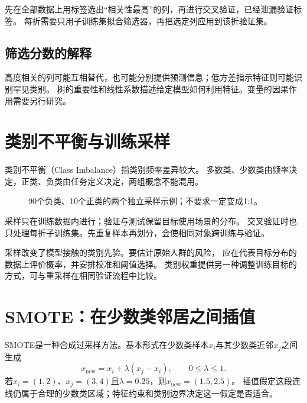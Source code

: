 先在全部数据上用标签选出“相关性最高”的列，再进行交叉验证，已经泄漏验证标签。
每折需要只用子训练集拟合筛选器，再把选定列应用到该折验证集。

\subsection{筛选分数的解释}
高度相关的列可能互相替代，也可能分别提供预测信息；低方差指示特征则可能识别罕见类别。
树的重要性和线性系数描述给定模型如何利用特征。变量的因果作用需要另行研究。


\section{类别不平衡与训练采样}
\label{sec:data-sampling}
类别不平衡（Class Imbalance）指类别频率差异较大。
多数类、少数类由频率决定，正类、负类由任务定义决定，两组概念不能混用。

\begin{figure}[htbp]
\centering
\caption{90个负类、10个正类的两个独立采样示例；不要求一定变成1:1。}
\par\smallskip
{}
\end{figure}

采样只在训练数据内进行；验证与测试保留目标使用场景的分布。
交叉验证时也只处理每折子训练集。先重复样本再划分，会使相同对象跨训练与验证。

\begin{pitfall}[采样后的概率需要重新核对]
采样改变了模型接触的类别先验。要估计原始人群的风险，
应在代表目标分布的数据上评价概率，并安排校准和阈值选择。
类别权重提供另一种调整训练目标的方式，可与重采样在相同验证流程中比较。
\end{pitfall}

\section{SMOTE：在少数类邻居之间插值}
\label{sec:data-smote}
SMOTE是一种合成过采样方法。基本形式在少数类样本$x_i$与其少数类近邻$x_j$之间生成
\[
 x_{\mathrm{new}}=x_i+\lambda(x_j-x_i),\qquad0\leq\lambda\leq1.
\]
若$x_i=(1,2)$、$x_j=(3,4)$且$\lambda=0.25$，则$x_{\mathrm{new}}=(1.5,2.5)$。
插值假定这段连线仍属于合理的少数类区域；特征约束和类别边界决定这一假定是否适合。

